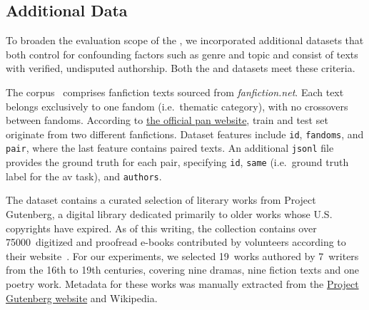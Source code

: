 \subsection{Additional Data}
\label{subsec:additional_data}
To broaden the evaluation scope of the \impAppr{}, we incorporated additional datasets that both control for confounding factors such as genre and topic and consist of texts with verified, undisputed authorship. 
Both the \dataPan{} and \dataGutenberg{} datasets meet these criteria.

The \dataPan{} corpus~\citep{bischoff_importance_2020} comprises fanfiction texts sourced from \textit{fanfiction.net}.
Each text belongs exclusively to one fandom (i.e.\ thematic category), with no crossovers between fandoms.
According to \href{https://pan.webis.de/clef20/pan20-web/author-identification.html}{the official \acs{pan} website}, 
train and test set originate from two different fanfictions.
Dataset features include \texttt{id}, \texttt{fandoms}, and \texttt{pair}, where the last feature contains paired texts.
An additional \texttt{jsonl} file provides the ground truth for each pair, specifying \texttt{id}, \texttt{same} (i.e.\ ground truth label for the \ac{av} task), and \texttt{authors}.

The \dataGutenberg{} dataset contains a curated selection of literary works from Project Gutenberg, a digital library dedicated primarily to older works whose U.S. copyrights have expired.
As of this writing, the collection contains over \num{75000}~digitized and proofread e-books contributed by volunteers according to their website~\citep{projectgutenberg}.
For our experiments, we selected 19~works authored by 7~writers from the 16th to 19th centuries, covering nine dramas, nine fiction texts and one poetry work.
Metadata for these works was manually extracted from the \href{https://www.gutenberg.org/}{Project Gutenberg website} and Wikipedia.


